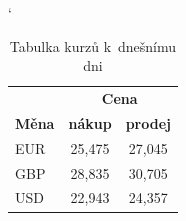 \documentclass[a4paper, 11pt]{article}
\begin{document}
        \begin{table}[ht]
            \centering
            \catcode` %
            \begin{tabular}{|l|c|c|}
                \hline
                & \multicolumn{2}{c|}{\textbf{Cena}} \\
                \cline{2-3}
                \textbf{Měna} & \textbf{nákup} & \textbf{prodej} \\
                \hline
                EUR & 25{,}475 & 27{,}045 \\
                GBP & 28{,}835 & 30{,}705 \\
                USD & 22{,}943 & 24{,}357 \\
                \hline
            \end{tabular}
            \caption{Tabulka kurzů k~dnešnímu dni}
            \label{tabulka}
        \end{table}

        \bigskip
\end{document}

